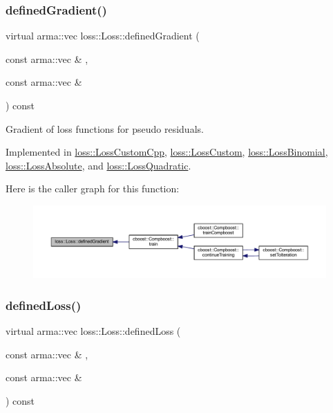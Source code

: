 \subsubsection{\texorpdfstring{defined\+Gradient()}{definedGradient()}}
{\footnotesize\ttfamily virtual arma\+::vec loss\+::\+Loss\+::defined\+Gradient (\begin{DoxyParamCaption}\item[{const arma\+::vec \&}]{,  }\item[{const arma\+::vec \&}]{ }\end{DoxyParamCaption}) const\hspace{0.3cm}{\ttfamily [pure virtual]}}



Gradient of loss functions for pseudo residuals. 



Implemented in \mbox{\hyperlink{classloss_1_1_loss_custom_cpp_a8db4924e9a9866c00adf4a8cfd3ec38a}{loss\+::\+Loss\+Custom\+Cpp}}, \mbox{\hyperlink{classloss_1_1_loss_custom_a91761ef42f85914dde2c3e6dd7fa1a0c}{loss\+::\+Loss\+Custom}}, \mbox{\hyperlink{classloss_1_1_loss_binomial_a68dcf02e90d09c3658733a9319a85f56}{loss\+::\+Loss\+Binomial}}, \mbox{\hyperlink{classloss_1_1_loss_absolute_a89e530450e42f20fc060ed9141fa8c04}{loss\+::\+Loss\+Absolute}}, and \mbox{\hyperlink{classloss_1_1_loss_quadratic_ad8b03123e260e2f034e507fff9695604}{loss\+::\+Loss\+Quadratic}}.

Here is the caller graph for this function\+:\nopagebreak
\begin{figure}[H]
\begin{center}
\leavevmode
\includegraphics[width=350pt]{classloss_1_1_loss_a267a4de70747ade4b2d84ce35a448979_icgraph}
\end{center}
\end{figure}
\mbox{\label{classloss_1_1_loss_ae9f94dd9b8311397583ba3a9cb485e94}} 
\subsubsection{\texorpdfstring{defined\+Loss()}{definedLoss()}}
{\footnotesize\ttfamily virtual arma\+::vec loss\+::\+Loss\+::defined\+Loss (\begin{DoxyParamCaption}\item[{const arma\+::vec \&}]{,  }\item[{const arma\+::vec \&}]{ }\end{DoxyParamCaption}) const\hspace{0.3cm}{\ttfamily [pure virtual]}}



